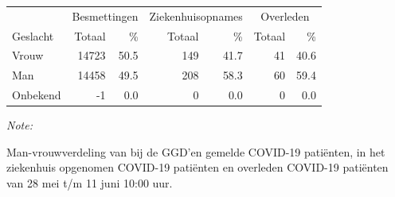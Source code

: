 \documentclass[
  english,
  man,floatsintext]{apa6}
\begin{document}
\begin{table}
\centering\begingroup\fontsize{11}{13}\selectfont

\begin{threeparttable}
\begin{tabular}{lrrrrrr}
\toprule
\multicolumn{1}{c}{ } & \multicolumn{2}{c}{Besmettingen} & \multicolumn{2}{c}{Ziekenhuisopnames} & \multicolumn{2}{c}{Overleden} \\
\cmidrule(l{3pt}r{3pt}){2-3} \cmidrule(l{3pt}r{3pt}){4-5} \cmidrule(l{3pt}r{3pt}){6-7}
Geslacht & Totaal & \% & Totaal & \% & Totaal & \%\\
\midrule
Vrouw & 14723 & 50.5 & 149 & 41.7 & 41 & 40.6\\
Man & 14458 & 49.5 & 208 & 58.3 & 60 & 59.4\\
Onbekend & -1 & 0.0 & 0 & 0.0 & 0 & 0.0\\
\bottomrule
\end{tabular}
\begin{tablenotes}
\item \textit{Note: } 
\item Man-vrouwverdeling van bij de GGD’en gemelde COVID-19 patiënten, in het ziekenhuis opgenomen COVID-19 patiënten en overleden COVID-19 patiënten van 28 mei t/m 11 juni 10:00 uur.
\end{tablenotes}
\end{threeparttable}
\endgroup{}
\end{table}
\newpage
\end{document}
